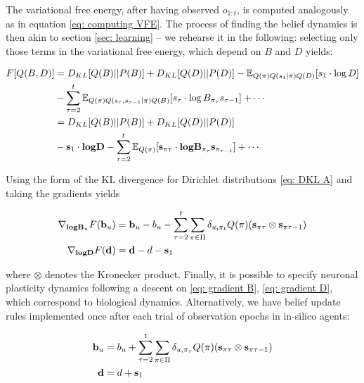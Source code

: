 \documentclass[review,12pt,authoryear]{elsarticle}
\newcommand{\E}{\mathbb E}
\begin{document}
The variational free energy, after having observed $o_{1:t}$, is computed analogously as in equation \eqref{eq: computing VFE}. The process of finding the belief dynamics is then akin to section \ref{sec: learning} -- we rehearse it in the following: selecting only those terms in the variational free energy, which depend on $B$ and $D$ yields:

\begin{equation}
    \begin{split}
        F[Q(B,D)] &= D_{KL}[Q(B)||P(B)] + D_{KL}[Q(D)||P(D)] 
         - \E_{Q(\pi)Q(s_1|\pi)Q(D)}[s_1\cdot \log D] \\ &- \sum_{\tau=2}^t \E_{Q(\pi)Q(s_\tau,s_{\tau-1} |\pi) Q(B)} [s_\tau \cdot \log B_{\pi_\tau}s_{\tau-1}] +\cdots\\
        &= D_{KL}[Q(B)||P(B)] + D_{KL}[Q(D)||P(D)] \\
        &- \bold s_1 \cdot \textbf{log} \bold D-\sum_{\tau=2}^t \E_{Q(\pi)}[\bold s_{\pi\tau} \cdot \textbf{log} \bold B_{\pi_\tau} \bold s_{\pi_{\tau-1}} ]+ \cdots
    \end{split}
\end{equation}
 
Using the form of the KL divergence for Dirichlet distributions \eqref{eq: DKL A} and taking the gradients yields

\begin{align}
       \label{eq: gradient B} \nabla_{\textbf{log} \bold B_u} F(\bold b_u) &=  \bold b_u -b_u -\sum_{\tau =2}^t \sum_{\pi \in \Pi} \delta_{u, \pi_t}  Q(\pi)(\bold s_{\pi\tau} \otimes \bold s_{\pi\tau-1})\\
       \label{eq: gradient D} \nabla_{\textbf{log} \bold D} F(\bold d) &=\bold d -d- \bold s_1
\end{align}

 
where $\otimes$ denotes the Kronecker product. Finally, it is possible to specify neuronal plasticity dynamics following a descent on \eqref{eq: gradient B}, \eqref{eq: gradient D}, which correspond to biological dynamics. Alternatively, we have belief update rules implemented once after each trial of observation epochs in in-silico agents:

\begin{align}
    \bold b_u &= b_u + \sum_{\tau =2}^t \sum_{\pi \in \Pi} \delta_{u, \pi_\tau}  Q(\pi)(\bold s_{\pi\tau} \otimes \bold s_{\pi\tau-1}) \\
    \bold d&= d +\bold s_1
\end{align}
\end{document}
